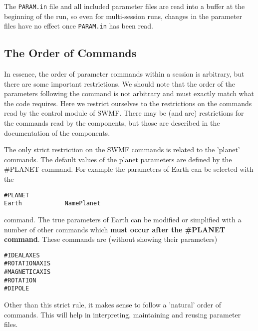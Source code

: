 The {\tt PARAM.in} file and all included parameter files are read into 
a buffer at the beginning of the run, so even for multi-session runs, 
changes in the parameter files have no effect once {\tt PARAM.in} 
has been read. 

\subsection{The Order of Commands \label{section:order}}

In essence, the order of parameter commands within a
session is arbitrary, but there are some important restrictions.  
We should note that the order of the parameters following 
the command is not arbitrary and must exactly match what the code requires.  
Here we restrict ourselves to the restrictions on the commands read by
the control module of SWMF. There may be (and are) restrictions
for the commands read by the components, but those are described
in the documentation of the components.

The only strict restriction on the SWMF commands is related
to the 'planet' commands. The default values of the 
planet parameters are defined by the \#PLANET command.
For example the parameters of Earth can be selected with the
\begin{verbatim}
#PLANET
Earth            NamePlanet
\end{verbatim}
command. The true parameters of Earth can be modified or simplified
with a number of other commands which {\bf must occur after the
\#PLANET command}. These commands are (without showing their parameters)
\begin{verbatim}
#IDEALAXES
#ROTATIONAXIS
#MAGNETICAXIS
#ROTATION
#DIPOLE
\end{verbatim}
Other than this strict rule, it makes sense to follow a 'natural'
order of commands. This will help in interpreting, maintaining
and reusing parameter files.

